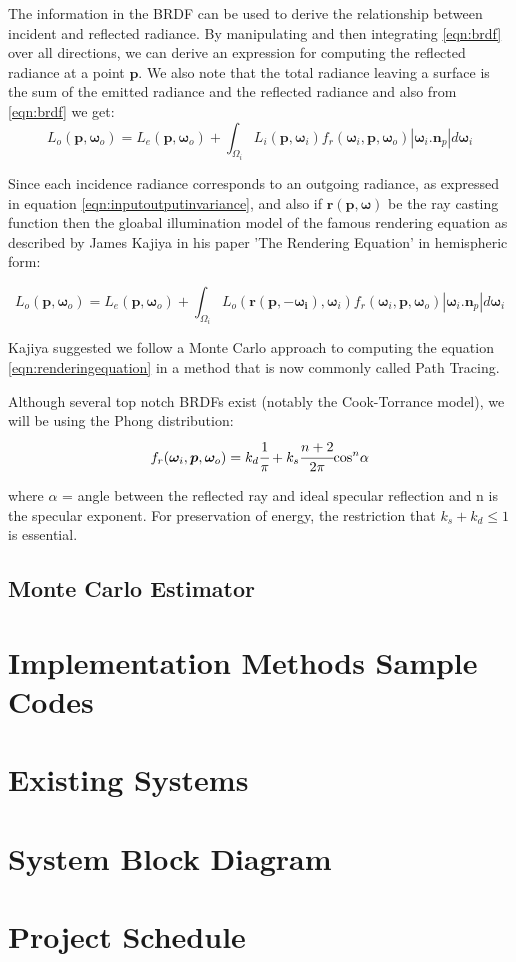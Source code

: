 \documentclass[a4paper, 12pt]{article}
\begin{document}
The information in the BRDF can be used to derive the relationship between incident and reflected 
radiance. By manipulating and then integrating \eqref{eqn:brdf} over all directions, we can derive 
an expression for computing the reflected radiance at a point $\bm{p}$. We also note that 
the total radiance leaving a surface is the sum of the emitted radiance and the reflected radiance and 
also from \eqref{eqn:brdf} we get:
$$
L_{o}(\bm{p}, \bm{\omega}_{o}) = L_{e}(\bm{p}, \bm{\omega}_{o}) + \int_{\Omega_{i}}L_{i}(\bm{p}, \bm{\omega}_{i})
f_{r}(\bm{\omega}_{i}, \bm{p}, \bm{\omega}_{o})|\bm{\omega}_{i}.\bm{n}_{p}|d\bm{\omega}_{i}
$$

Since each incidence radiance corresponds to an outgoing 
radiance, as expressed in equation \eqref{eqn:inputoutputinvariance}, 
and also if $\bm{r}(\bm{p}, \bm{\omega})$ be the ray casting function then the 
gloabal illumination model of the famous rendering equation as 
described by James Kajiya in his paper 'The Rendering Equation'\cite{kajiya}
in hemispheric form: 

\begin{equation}\label{eqn:renderingequation}
L_{o}(\bm{p}, \bm{\omega}_{o}) = L_{e}(\bm{p}, \bm{\omega}_{o}) + \int_{\Omega_{i}}L_{o}(\bm{r}(\bm{p}, -\bm{\omega_{i}}), \bm{\omega}_{i})
f_{r}(\bm{\omega}_{i}, \bm{p}, \bm{\omega}_{o})|\bm{\omega}_{i}.\bm{n}_{p}|d\bm{\omega}_{i}
\end{equation}

Kajiya suggested we follow a Monte Carlo approach 
to computing the equation \eqref{eqn:renderingequation} 
in a method that is now commonly called Path Tracing.

Although several top notch BRDFs exist (notably 
the Cook-Torrance model\cite{cooktorrance}), 
we will be using the Phong distribution: 
$$
f_{r}(\bm{\omega}_{i}, \bm{p}, \bm{\omega}_{o}) = k_{d}\cfrac{1}{\pi}+k_{s}\cfrac{n+2}{2\pi}\text{cos}^{n}\alpha
$$

where $\alpha$ = angle between the reflected ray and ideal specular reflection and 
n is the specular exponent. For preservation of energy, the restriction that $k_{s}+k_{d}\leq 1$
is essential.

\subsection{Monte Carlo Estimator}



\section{Implementation Methods Sample Codes}


\section{Existing Systems}

\section{System Block Diagram}

\section{Project Schedule}



\newpage
\printbibliography
\end{document}
